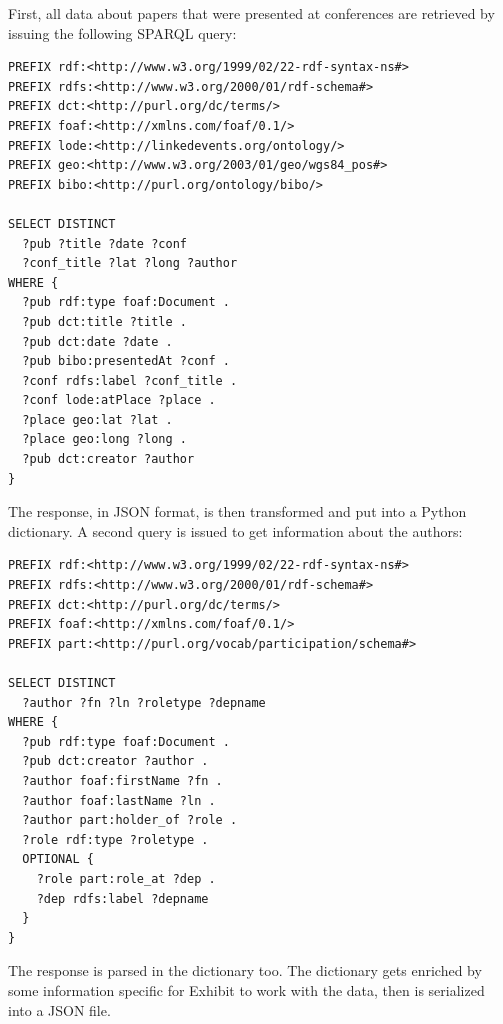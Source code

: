 \documentclass[a4paper,11pt]{report}
\begin{document}
First, all data about papers that were presented at conferences are retrieved by issuing the following SPARQL query:
\begin{verbatim}
PREFIX rdf:<http://www.w3.org/1999/02/22-rdf-syntax-ns#>
PREFIX rdfs:<http://www.w3.org/2000/01/rdf-schema#>
PREFIX dct:<http://purl.org/dc/terms/>
PREFIX foaf:<http://xmlns.com/foaf/0.1/>
PREFIX lode:<http://linkedevents.org/ontology/>
PREFIX geo:<http://www.w3.org/2003/01/geo/wgs84_pos#>
PREFIX bibo:<http://purl.org/ontology/bibo/>

SELECT DISTINCT 
  ?pub ?title ?date ?conf 
  ?conf_title ?lat ?long ?author
WHERE {
  ?pub rdf:type foaf:Document .
  ?pub dct:title ?title .
  ?pub dct:date ?date .
  ?pub bibo:presentedAt ?conf .
  ?conf rdfs:label ?conf_title .
  ?conf lode:atPlace ?place .
  ?place geo:lat ?lat .
  ?place geo:long ?long .
  ?pub dct:creator ?author
}
\end{verbatim}
The response, in JSON format, is then transformed and put into a Python dictionary. A second query is issued to get information about the authors: 
\begin{verbatim}
PREFIX rdf:<http://www.w3.org/1999/02/22-rdf-syntax-ns#>
PREFIX rdfs:<http://www.w3.org/2000/01/rdf-schema#>
PREFIX dct:<http://purl.org/dc/terms/>
PREFIX foaf:<http://xmlns.com/foaf/0.1/>
PREFIX part:<http://purl.org/vocab/participation/schema#>

SELECT DISTINCT 
  ?author ?fn ?ln ?roletype ?depname
WHERE {
  ?pub rdf:type foaf:Document .
  ?pub dct:creator ?author .
  ?author foaf:firstName ?fn .
  ?author foaf:lastName ?ln .
  ?author part:holder_of ?role . 
  ?role rdf:type ?roletype . 
  OPTIONAL {
    ?role part:role_at ?dep . 
    ?dep rdfs:label ?depname
  }
}\end{verbatim}
The response is parsed in the dictionary too. The dictionary gets enriched by some information specific for Exhibit to work with the data, then is serialized into a JSON file. 
\end{document}
